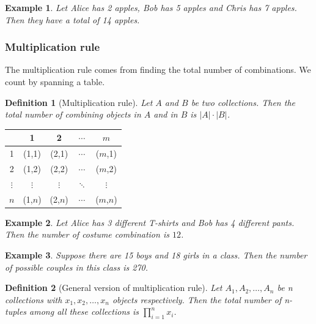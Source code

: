 \documentclass[12pt]{article}
\newtheorem{definition}{Definition}[section]
\newtheorem*{example}{Example}
\begin{document}
    \begin{example}
        Let Alice has 2 apples, Bob has 5 apples and Chris has 7 apples. Then they have a total of 14 apples.
    \end{example}

    \subsubsection*{Multiplication rule}

    The multiplication rule comes from finding the total number of combinations. We count by spanning a table.

    \begin{definition}[Multiplication rule]
        Let $A$ and $B$ be two collections. Then the total number of combining objects in $A$ and in $B$ is $|A|\cdot |B|$.
    \end{definition}

    \begin{center}
        \begin{tabular}{|c|c|c|c|c|}
            \hline
            &1&2&$\cdots$&$m$\\
            \hline
            1&(1,1)&(2,1)&$\cdots$&($m$,1)\\
            \hline
            2&(1,2)&(2,2)&$\cdots$&($m$,2)\\
            \hline
            $\vdots$&$\vdots$&$\vdots$&$\ddots$&$\vdots$\\
            \hline
            $n$&(1,$n$)&(2,$n$)&$\cdots$&($m$,$n$)\\
            \hline
        \end{tabular}
    \end{center}

    \begin{example}
        Let Alice has 3 different T-shirts and Bob has 4 different pants. Then the number of costume combination is $12$.
    \end{example}
    
    \begin{example}
        Suppose there are 15 boys and 18 girls in a class. Then the number of possible couples in this class is 270.
    \end{example}

    \begin{definition}[General version of multiplication rule]
        Let $A_1,A_2,\dots,A_n$ be n collections with $x_1,x_2,\dots,x_n$ objects respectively. Then the total number of n-tuples among all these collections is $\displaystyle \prod_{i=1}^{n}x_i$. 
    \end{definition}
\end{document}
